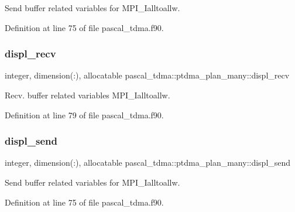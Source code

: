 Send buffer related variables for M\+P\+I\+\_\+\+Ialltoallw. 



Definition at line 75 of file pascal\+\_\+tdma.\+f90.

\mbox{\label{structpascal__tdma_1_1ptdma__plan__many_a1801ea6bbff319dd594a5e993bc5d542}} 
\subsubsection{\texorpdfstring{displ\_recv}{displ\_recv}}
{\footnotesize\ttfamily integer, dimension(\+:), allocatable pascal\+\_\+tdma\+::ptdma\+\_\+plan\+\_\+many\+::displ\+\_\+recv}



Recv. buffer related variables M\+P\+I\+\_\+\+Ialltoallw. 



Definition at line 79 of file pascal\+\_\+tdma.\+f90.

\mbox{\label{structpascal__tdma_1_1ptdma__plan__many_a1c7544758e7ccfcd3b07e91caf0d8f3d}} 
\subsubsection{\texorpdfstring{displ\_send}{displ\_send}}
{\footnotesize\ttfamily integer, dimension(\+:), allocatable pascal\+\_\+tdma\+::ptdma\+\_\+plan\+\_\+many\+::displ\+\_\+send}



Send buffer related variables for M\+P\+I\+\_\+\+Ialltoallw. 



Definition at line 75 of file pascal\+\_\+tdma.\+f90.

\mbox{\label{structpascal__tdma_1_1ptdma__plan__many_ad94248e2aa0653f151f0575d62d6fff7}} 
